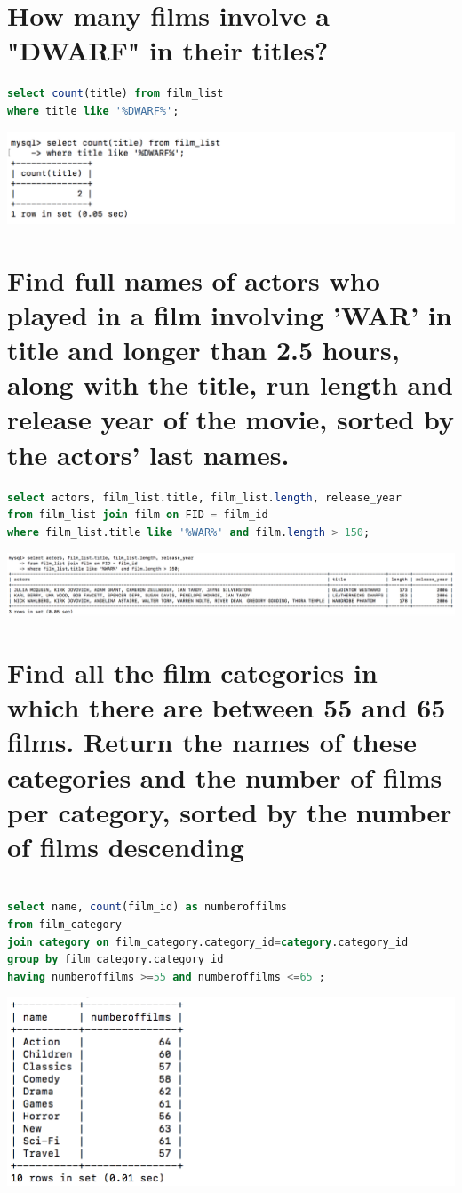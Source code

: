 \documentclass{article}
\begin{document}
\section{How many films involve a "DWARF" in their titles?}
\begin{lstlisting}[language=sql]
select count(title) from film_list 
where title like '%DWARF%';
\end{lstlisting}
\includegraphics[width=\linewidth]{4.png}

\section{Find full names of actors who played in a film involving ’WAR’ in title and longer than 2.5 hours, along with the title, run length and release year of the movie, sorted by the actors’ last names.}
\begin{lstlisting}[language=sql]
select actors, film_list.title, film_list.length, release_year
from film_list join film on FID = film_id
where film_list.title like '%WAR%' and film.length > 150;
\end{lstlisting}
\includegraphics[width=\linewidth]{5.png}

\section{Find all the film categories in which there are between 55 and 65 films. Return the names of these categories and the number of films per category, sorted by the number of films descending}
\begin{lstlisting}[language=sql]

select name, count(film_id) as numberoffilms
from film_category 
join category on film_category.category_id=category.category_id
group by film_category.category_id 
having numberoffilms >=55 and numberoffilms <=65 ;
\end{lstlisting}
\includegraphics[width=\linewidth]{6.png}
\end{document}
